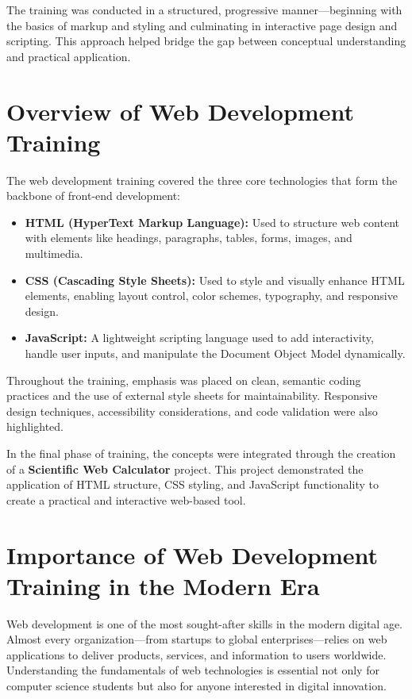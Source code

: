\documentclass[a4paper,12pt,oneside]{report}
\numberwithin{equation}{chapter}
\numberwithin{figure}{chapter}
\numberwithin{table}{chapter}
\begin{document}
The training was conducted in a structured, progressive manner—beginning with the basics of markup and styling and culminating in interactive page design and scripting. This approach helped bridge the gap between conceptual understanding and practical application.

\section{Overview of Web Development Training}

The web development training covered the three core technologies that form the backbone of front-end development:

\begin{itemize}
    \item \textbf{HTML (HyperText Markup Language):} Used to structure web content with elements like headings, paragraphs, tables, forms, images, and multimedia.
    \item \textbf{CSS (Cascading Style Sheets):} Used to style and visually enhance HTML elements, enabling layout control, color schemes, typography, and responsive design.
    \item \textbf{JavaScript:} A lightweight scripting language used to add interactivity, handle user inputs, and manipulate the Document Object Model dynamically.
\end{itemize}

Throughout the training, emphasis was placed on clean, semantic coding practices and the use of external style sheets for maintainability. Responsive design techniques, accessibility considerations, and code validation were also highlighted. 

In the final phase of training, the concepts were integrated through the creation of a \textbf{Scientific Web Calculator} project. This project demonstrated the application of HTML structure, CSS styling, and JavaScript functionality to create a practical and interactive web-based tool.

\section{Importance of Web Development Training in the Modern Era}

Web development is one of the most sought-after skills in the modern digital age. Almost every organization—from startups to global enterprises—relies on web applications to deliver products, services, and information to users worldwide. Understanding the fundamentals of web technologies is essential not only for computer science students but also for anyone interested in digital innovation.
\end{document}
